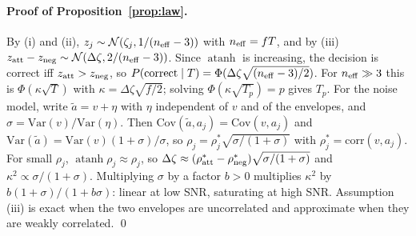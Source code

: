 \paragraph{Proof of Proposition~\ref{prop:law}.} By (i) and (ii),
$z_j\sim\mathcal N(\zeta_j,1/(n_{\rm eff}-3))$ with $n_{\rm eff}=fT$, and by (iii)
$z_{\rm att}-z_{\rm neg}\sim\mathcal N(\Delta\zeta,2/(n_{\rm eff}-3))$. Since $\operatorname{atanh}$ is increasing, the
decision is correct iff $z_{\rm att}>z_{\rm neg}$, so
$P(\mathrm{correct}\mid T)=\Phi(\Delta\zeta\sqrt{(n_{\rm eff}-3)/2})$. For $n_{\rm eff}\gg3$ this is
$\Phi(\kappa\sqrt T)$ with $\kappa=\Delta\zeta\sqrt{f/2}$; solving $\Phi(\kappa\sqrt{T_p})=p$
gives $T_p$. For the noise model, write $\tilde a=v+\eta$ with $\eta$ independent of $v$ and
of the envelopes, and $\sigma=\mathrm{Var}(v)/\mathrm{Var}(\eta)$. Then
$\mathrm{Cov}(\tilde a,a_j)=\mathrm{Cov}(v,a_j)$ and
$\mathrm{Var}(\tilde a)=\mathrm{Var}(v)(1+\sigma)/\sigma$, so
$\rho_j=\rho_j^\ast\sqrt{\sigma/(1+\sigma)}$ with $\rho^\ast_j=\mathrm{corr}(v,a_j)$. For small
$\rho_j$, $\operatorname{atanh}\rho_j\approx\rho_j$, so
$\Delta\zeta\approx(\rho^\ast_{\rm att}-\rho^\ast_{\rm neg})\sqrt{\sigma/(1+\sigma)}$ and
$\kappa^2\propto\sigma/(1+\sigma)$. Multiplying $\sigma$ by a factor $b>0$ multiplies $\kappa^2$ by
$b(1+\sigma)/(1+b\sigma)$: linear at low SNR, saturating at high SNR. Assumption (iii) is
exact when the two envelopes are uncorrelated and approximate when they are weakly
correlated. \qed
